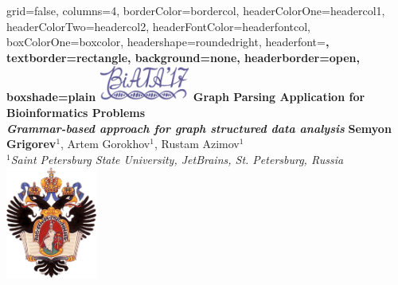 \documentclass[a0paper,portrait]{baposter}
\begin{document}
\begin{poster}{
grid=false,
columns=4,
borderColor=bordercol, %
headerColorOne=headercol1, %
headerColorTwo=headercol2, %
headerFontColor=headerfontcol, %
boxColorOne=boxcolor, %
headershape=roundedright, %
headerfont=\Large\sf\bf, %
textborder=rectangle,
background=none,
headerborder=open, %
boxshade=plain
}
{\includegraphics[width=3cm]{BiAtA2017.png}}
%
%
{ \bf  \huge {Graph Parsing Application for Bioinformatics Problems} \\  \Large \it Grammar-based approach for graph structured data analysis} %
{\vspace{0.3em} \smaller \textbf{Semyon Grigorev$^1$}, Artem Gorokhov$^1$, Rustam Azimov$^1$ \\  %
\smaller \it $^1${Saint Petersburg State University, JetBrains, St. Petersburg, Russia } \\ %
}
{\includegraphics[width=3cm]{SPbGU_Logo.png}} %


\end{poster}
\end{document}
